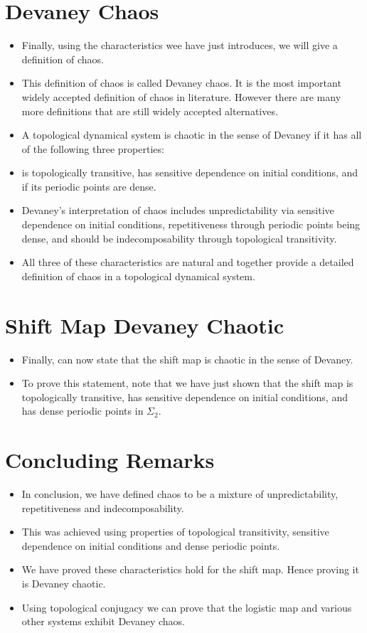 \documentclass{article}
\begin{document}
    \section{Devaney Chaos}
    \begin{itemize}
        \item Finally, using the characteristics wee have just introduces, we will give a definition of chaos.
        \item This definition of chaos is called Devaney chaos. It is the most important widely accepted definition of chaos in literature. However there are many more definitions that are still widely accepted alternatives.
        \item A topological dynamical system is chaotic in the sense of Devaney if it has all of the following three properties: 
        \item is topologically transitive, has sensitive dependence on initial conditions, and if its periodic points are dense.
        \item Devaney's interpretation of chaos includes unpredictability via sensitive dependence on initial conditions, repetitiveness through periodic points being dense, and should be indecomposability through topological transitivity.
        \item All three of these characteristics are natural and together provide a detailed definition of chaos in a topological dynamical system.
    \end{itemize}

    \section{Shift Map Devaney Chaotic}
    \begin{itemize}
        \item Finally, can now state that the shift map is chaotic in the sense of Devaney.
        \item To prove this statement, note that we have just shown that the shift map is topologically transitive, has sensitive dependence on initial conditions, and has dense periodic points in $\Sigma_2$.
    \end{itemize}

    \section{Concluding Remarks}
    \begin{itemize}
        \item In conclusion, we have defined chaos to be a mixture of unpredictability, repetitiveness and indecomposability.
        \item This was achieved using properties of topological transitivity, sensitive dependence on initial conditions and dense periodic points.
        \item We have proved these characteristics hold for the shift map. Hence proving it is Devaney chaotic.
        \item Using topological conjugacy we can prove that the logistic map and various other systems exhibit Devaney chaos.
    \end{itemize}
\end{document}
